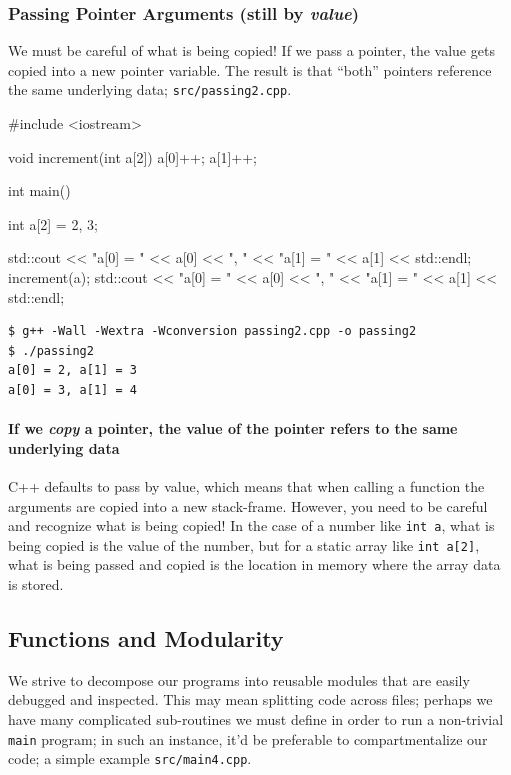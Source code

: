 \documentclass[12pt,letterpaper,twoside]{article}
\begin{document}
\subsubsection{Passing Pointer Arguments (still by \emph{value})}
We must be careful of what is being copied! If we pass a pointer, the value gets 
copied into a new pointer variable. The result is that ``both'' pointers reference the same
underlying data;
\texttt{src/passing2.cpp}.

\begin{cpp}
#include <iostream>

void increment(int a[2]) {
  a[0]++;
  a[1]++;
}

int main() {
  int a[2] = {2, 3};

  std::cout << "a[0] = " << a[0] << ", " << "a[1] = " << a[1] << std::endl;
  increment(a);
  std::cout << "a[0] = " << a[0] << ", " << "a[1] = " << a[1] << std::endl;
}
\end{cpp}

\begin{verbatim}
$ g++ -Wall -Wextra -Wconversion passing2.cpp -o passing2
$ ./passing2
a[0] = 2, a[1] = 3
a[0] = 3, a[1] = 4
\end{verbatim}

\paragraph{If we \emph{copy} a pointer, the value of the pointer refers to the same underlying data}
C++ defaults to pass by value, which means that when calling a
function the arguments are copied into a new stack-frame.
However, you need to be careful and recognize what is being copied!
In the case of a number like \texttt{int\ a}, what is being copied is
the value of the number, 
but for a static array like \texttt{int\ a{[}2{]}}, 
what is being passed and copied is the location in memory where the 
array data is stored.

\subsection{Functions and Modularity}
We strive to decompose our programs into reusable modules that are easily debugged and 
inspected. This may mean splitting code across files; perhaps we have many complicated
sub-routines we must define in order to run a non-trivial \texttt{main} program; in such
an instance, it'd be preferable to compartmentalize our code; a simple example
\texttt{src/main4.cpp}.
\end{document}
